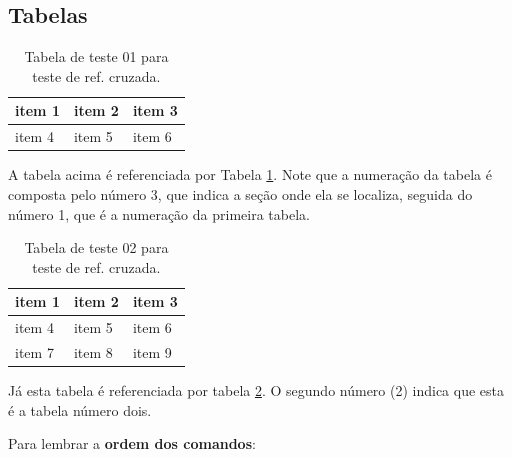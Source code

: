\documentclass[a4paper,12pt,oneside]{memoir}
\begin{document}
\subsection{Tabelas}
\begin{table}[h!]
\begin{center}
\begin{tabularx}{0.8\textwidth} { 
  | >{\centering\arraybackslash}X 
  | >{\centering\arraybackslash}X 
  | >{\centering\arraybackslash}X | }
 \hline
 item 1 & item 2 & item 3 \\
 \hline
 item 4  & item 5  & item 6  \\
\hline
\end{tabularx}
\caption{Tabela de teste 01 para teste de ref. cruzada.}
\label{table:1}
\end{center}
\end{table}

A tabela acima é referenciada por Tabela \ref{table:1}. Note que a numeração da tabela é composta pelo número 3, que indica a seção onde ela se localiza, seguida do número 1, que é a numeração da primeira tabela.

\begin{table}[h!]
\begin{center}
\begin{tabularx}{0.8\textwidth} { 
  | >{\centering\arraybackslash}X 
  | >{\centering\arraybackslash}X 
  | >{\centering\arraybackslash}X | }
 \hline
 item 1 & item 2 & item 3 \\
 \hline
 item 4  & item 5  & item 6  \\
\hline
item 7  & item 8  & item 9  \\
\hline
\end{tabularx}
\caption{Tabela de teste 02 para teste de ref. cruzada.}
\label{table:2}
\end{center}
\end{table}

Já esta tabela é referenciada por tabela \ref{table:2}. O segundo número (2) indica que esta é a tabela número dois.

Para lembrar a \textbf{ordem dos comandos}:
\end{document}
